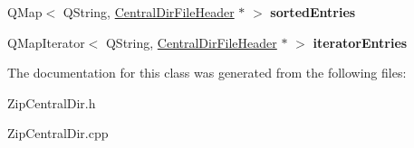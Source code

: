 \begin{DoxyCompactItemize}
\item 
Q\+Map$<$ Q\+String, \hyperlink{class_central_dir_file_header}{Central\+Dir\+File\+Header} $\ast$ $>$ {\bfseries sorted\+Entries}\hypertarget{class_zip_central_dir_a3643cdef8204bc6cbe8c94650d52e52f}{}\label{class_zip_central_dir_a3643cdef8204bc6cbe8c94650d52e52f}

\item 
Q\+Map\+Iterator$<$ Q\+String, \hyperlink{class_central_dir_file_header}{Central\+Dir\+File\+Header} $\ast$ $>$ {\bfseries iterator\+Entries}\hypertarget{class_zip_central_dir_aa51019093eb039145251932f2786f73d}{}\label{class_zip_central_dir_aa51019093eb039145251932f2786f73d}

\end{DoxyCompactItemize}


The documentation for this class was generated from the following files\+:\begin{DoxyCompactItemize}
\item 
Zip\+Central\+Dir.\+h\item 
Zip\+Central\+Dir.\+cpp\end{DoxyCompactItemize}
